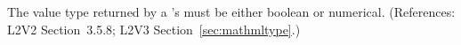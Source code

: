 The value type returned by a \FunctionDefinition's  must be
either boolean or numerical.  (References: L2V2 Section~3.5.8;
L2V3 Section~\ref{sec:mathmltype}.)
